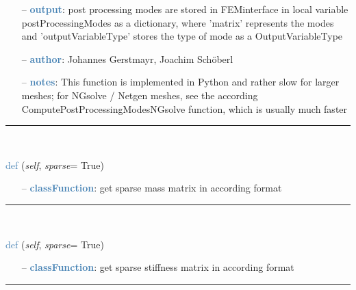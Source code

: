 \begin{itemize}[leftmargin=1.4cm]
\begin{itemize}[leftmargin=0.5cm]
\begin{itemize}[leftmargin=1.4cm]
\begin{itemize}[leftmargin=1.4cm]
\begin{itemize}[leftmargin=0.5cm]
\begin{itemize}[leftmargin=0.7cm]
  \item[--]  \textcolor{steelblue}{\bf output}: post processing modes are stored in FEMinterface in local variable postProcessingModes as a dictionary, where 'matrix' represents the modes and 'outputVariableType' stores the type of mode as a OutputVariableType  \item[--]  \textcolor{steelblue}{\bf author}: Johannes Gerstmayr, Joachim Sch\"oberl  \item[--]  \textcolor{steelblue}{\bf notes}: This function is implemented in Python and rather slow for larger meshes; for NGsolve / Netgen meshes, see the according ComputePostProcessingModesNGsolve function, which is usually much faster\vspace{12pt}\end{itemize}
%
\noindent\rule{8cm}{0.75pt}\vspace{1pt} \\ 
\begin{flushleft}
\noindent \textcolor{steelblue}{def {\bf {}}}\label{sec:FEM:FEMinterface:GetMassMatrix}
({\it self}, {\it sparse}= True)
\end{flushleft}
\setlength{\itemindent}{0.7cm}
\begin{itemize}[leftmargin=0.7cm]
  \item[--]  \textcolor{steelblue}{\bf classFunction}: get sparse mass matrix in according format\vspace{12pt}\end{itemize}
%
\noindent\rule{8cm}{0.75pt}\vspace{1pt} \\ 
\begin{flushleft}
\noindent \textcolor{steelblue}{def {\bf {}}}\label{sec:FEM:FEMinterface:GetStiffnessMatrix}
({\it self}, {\it sparse}= True)
\end{flushleft}
\setlength{\itemindent}{0.7cm}
\begin{itemize}[leftmargin=0.7cm]
  \item[--]  \textcolor{steelblue}{\bf classFunction}: get sparse stiffness matrix in according format\vspace{12pt}\end{itemize}
%
\noindent\rule{8cm}{0.75pt}\vspace{1pt} \\ 
\begin{flushleft}

\end{flushleft}
\end{itemize}
\end{itemize}
\end{itemize}
\end{itemize}
\end{itemize}

